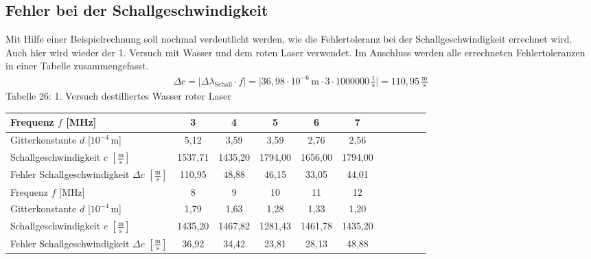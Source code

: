 \documentclass[fontsize=12pt]{scrartcl}
\begin{document}
\newpage

\subsection{Fehler bei der Schallgeschwindigkeit}

Mit Hilfe einer Beispielrechnung soll nochmal verdeutlicht werden, wie die Fehlertoleranz bei der Schallgeschwindigkeit errechnet wird.
Auch hier wird wieder der 1. Versuch mit Wasser und dem roten Laser verwendet. Im Anschluss werden alle errechneten Fehlertoleranzen in einer Tabelle zusammengefasst.
\begin{align*}
\Delta c=\vert \Delta \lambda_{\text{Schall}} \cdot f \vert = \vert 36,98 \cdot 10^{-6}\,{\text{m}} \cdot 3\cdot 1000000\,\frac{1}{{\text{s}}} \vert =110,95\,\frac{{\text{m}}}{{\text{s}}}
\end{align*}
\noindent
Tabelle 26: 1. Versuch destilliertes Wasser roter Laser  \\
\begin{tabular}{|l|c|c|c|c|c|c|c|c|c|c|} \hline
Frequenz $f$ [MHz] & 3 & 4 & 5 & 6 & 7 \\ \hline
Gitterkonstante $d$ [$10^{-4}$\,m] & 5,12 & 3,59 & 3,59 & 2,76 & 2,56  \\ \hline
Schallgeschwindigkeit $c$ $[\frac{{\text{m}}}{{\text{s}}}]$ & 1537,71 &1435,20 &1794,00 &1656,00 & 1794,00 \\ \hline
Fehler Schallgeschwindigkeit $\Delta c$ $[\frac{{\text{m}}}{{\text{s}}}]$ & 110,95 &
48,88 &
46,15 &
33,05 &
44,01 \\ \hline
Frequenz $f$ [MHz] & 8 & 9 & 10 & 11 & 12\\ \hline
Gitterkonstante $d$ [$10^{-4}$\,m] &  1,79 & 1,63 & 1,28 & 1,33 & 1,20 \\ \hline
Schallgeschwindigkeit $c$ $[\frac{{\text{m}}}{{\text{s}}}]$ & 1435,20 & 1467,82 &1281,43 &1461,78 &1435,20 \\ \hline
Fehler Schallgeschwindigkeit $\Delta c$ $[\frac{{\text{m}}}{{\text{s}}}]$ & 36,92 &
34,42 &
23,81 &
28,13 &
48,88  \\ \hline
\end{tabular} \\
\end{document}
